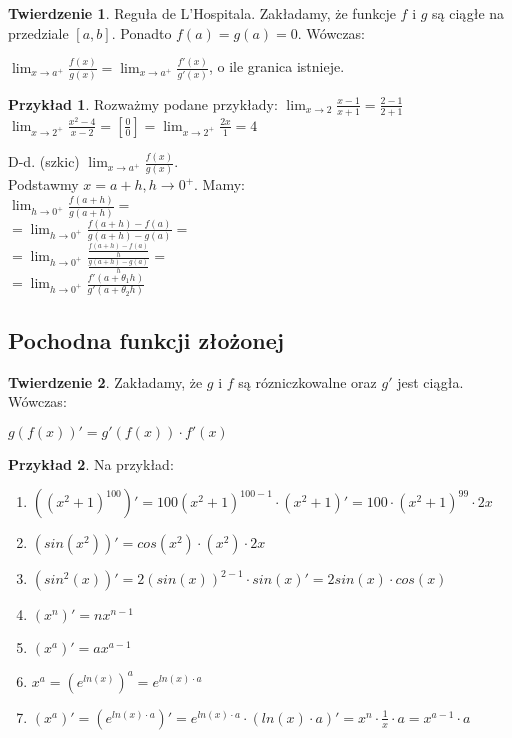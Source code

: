 \documentclass{article}
\theoremstyle{definition}
\theoremstyle{definition}
\newtheorem{tw}{Twierdzenie}[subsection]
\theoremstyle{definition}
\newtheorem{pk}{Przykład}[subsection]
\theoremstyle{definition}
\begin{document}
\begin{tw}
    Reguła de L'Hospitala. Zakładamy, że funkcje $f$ i $g$ są ciągłe na przedziale $[a,b]$. Ponadto $f(a)=g(a)=0$.
    Wówczas:
    \begin{center}
        $\lim_{x\rightarrow a^+} \frac{f(x)}{g(x)} = \lim_{x\rightarrow a^+} \frac{f'(x)}{g'(x)}$, o ile granica istnieje.
    \end{center}
\end{tw}

\begin{pk}
    Rozważmy podane przykłady:
    $\lim_{x\rightarrow 2} \frac{x-1}{x+1} = \frac{2-1}{2+1}$\\
    $\lim_{x\rightarrow 2^+} \frac{x^2-4}{x-2}=\left[\frac{0}{0}\right] = \lim_{x\rightarrow 2^+} \frac{2x}{1}=4$
\end{pk}

D-d. (szkic)
$\lim_{x\rightarrow a^+} \frac{f(x)}{g(x)}$.\\
Podstawmy $x=a+h, h\rightarrow 0^+$. Mamy:\\
$\lim_{h\rightarrow 0^+} \frac{f(a+h)}{g(a+h)}=$\\
$=\lim_{h\rightarrow 0^+} \frac{f(a+h)-f(a)}{g(a+h)-g(a)}=$\\
$=\lim_{h\rightarrow 0^+} \frac{\frac{f(a+h)-f(a)}{h}}{\frac{g(a+h)-g(a)}{h}}=$\\
$=\lim_{h\rightarrow 0^+} \frac{f'(a+\theta_1h)}{g'(a+\theta_2 h)}$

\subsection{Pochodna funkcji złożonej}

\begin{tw}
    Zakładamy, że $g$ i $f$ są rózniczkowalne oraz $g'$ jest ciągła. Wówczas:
    \begin{center}
        $g(f(x))'=g'(f(x))\cdot f'(x)$
    \end{center}
\end{tw}

\begin{pk}
    Na przykład:\\
    \begin{enumerate}
        \item $\left(\left(x^2+1\right)^100\right)'=100(x^2+1)^{100-1}\cdot(x^2+1)'=100\cdot(x^2+1)^99\cdot 2x$
        \item $\left(sin(x^2)\right)'=cos(x^2)\cdot(x^2)\cdot 2x$
        \item $\left(sin^2(x)\right)'=2(sin(x))^{2-1}\cdot sin(x)'=2sin(x)\cdot cos(x)$
        \item $(x^n)'=nx^{n-1}$
        \item $(x^a)'=ax^{a-1}$
        \item $x^a=(e^{ln(x)})^{a}=e^{ln(x)\cdot a}$
        \item $(x^a)'=\left(e^{ln(x)\cdot a}\right)'=e^{ln(x)\cdot a}\cdot \left(ln(x)\cdot a\right)'=x^n\cdot\frac{1}{x}\cdot a= x^{a-1}\cdot a$
    \end{enumerate}
\end{pk}
\end{document}
